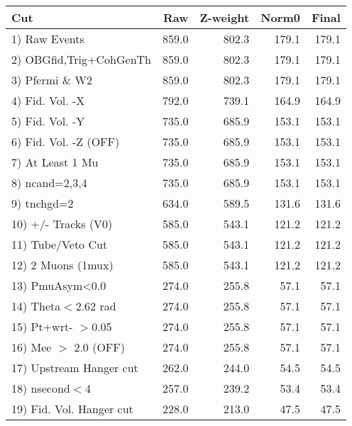  \begin{table}[h!]\centering
 \begin{tabular}{||l||r|r|r|r||}
 \hline
 \hline
 Cut & Raw & Z-weight & Norm0 & Final \\
 \hline
  1) Raw Events           &       859.0 &       802.3 &       179.1 &       179.1 \\
  2) OBGfid,Trig+CohGenTh &       859.0 &       802.3 &       179.1 &       179.1 \\
  3) Pfermi \& W2         &       859.0 &       802.3 &       179.1 &       179.1 \\
  4) Fid. Vol. -X         &       792.0 &       739.1 &       164.9 &       164.9 \\
  5) Fid. Vol. -Y         &       735.0 &       685.9 &       153.1 &       153.1 \\
  6) Fid. Vol. -Z (OFF)   &       735.0 &       685.9 &       153.1 &       153.1 \\
  7) At Least 1 Mu        &       735.0 &       685.9 &       153.1 &       153.1 \\
  8) ncand=2,3,4          &       735.0 &       685.9 &       153.1 &       153.1 \\
  9) tnchgd=2             &       634.0 &       589.5 &       131.6 &       131.6 \\
 10) +/- Tracks (V0)      &       585.0 &       543.1 &       121.2 &       121.2 \\
 11) Tube/Veto Cut        &       585.0 &       543.1 &       121.2 &       121.2 \\
 12) 2 Muons (1mux)       &       585.0 &       543.1 &       121.2 &       121.2 \\
 13) PmuAsym<0.0          &       274.0 &       255.8 &        57.1 &        57.1 \\
 14) Theta$<$2.62 rad     &       274.0 &       255.8 &        57.1 &        57.1 \\
 15) Pt+wrt- $>$0.05      &       274.0 &       255.8 &        57.1 &        57.1 \\
 16) Mee $>$ 2.0  (OFF)   &       274.0 &       255.8 &        57.1 &        57.1 \\
 17) Upstream Hanger cut  &       262.0 &       244.0 &        54.5 &        54.5 \\
 18) nsecond$<$4          &       257.0 &       239.2 &        53.4 &        53.4 \\
 19) Fid. Vol. Hanger cut &       228.0 &       213.0 &        47.5 &        47.5 \\

\end{tabular}
\end{table}
